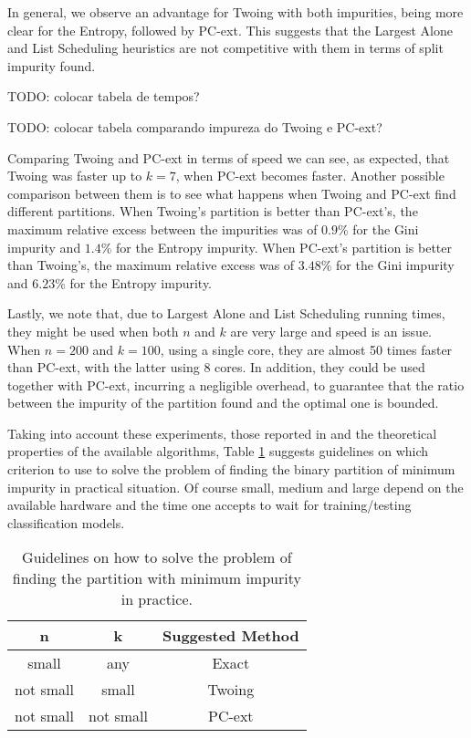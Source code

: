 In general, we observe an advantage for Twoing with both impurities, being more clear for the Entropy, followed by PC-ext. This suggests that the Largest Alone and List Scheduling heuristics are not competitive with them in terms of split impurity found.

TODO: colocar tabela de tempos?

TODO: colocar tabela comparando impureza do Twoing e PC-ext?

Comparing Twoing and PC-ext in terms of speed we can see, as expected, that Twoing was faster up to $k=7$, when PC-ext becomes faster.
Another possible comparison between them is to see what happens when Twoing and PC-ext find different partitions. When Twoing's partition is better than PC-ext's, the maximum relative excess between the impurities was of $0.9\%$ for the Gini impurity and $1.4 \%$ for the Entropy impurity.
When PC-ext's partition is better than Twoing's, the  maximum relative excess was of $3.48 \%$ for the Gini impurity and $6.23 \%$ for the Entropy impurity. 

Lastly, we note that, due to Largest Alone and List Scheduling running times, they might be used when both $n$ and $k$ are very large and
speed is an  issue. When $n=200$ and $k=100$, using a single core, they are almost 50 times
faster than PC-ext, with the latter using 8 cores. In addition, they could be  used together with PC-ext, incurring a negligible overhead, to guarantee that the ratio between the impurity of the partition found and the optimal one is bounded.

 
Taking into account these  experiments, those reported in \cite{journals/datamine/CoppersmithHH99}
and the  theoretical properties of the available algorithms, 
Table  \ref{tab:guidelines}  suggests  guidelines on which criterion to use to solve the 
problem of finding the binary partition of minimum impurity in practical situation.
Of course small, medium and large depend on the available hardware and the time one accepts to wait for training/testing classification models. 


\begin{table}[htb]
\centering
\caption{Guidelines on how to solve the problem of finding the partition with minimum impurity in practice.}
\label{tab:guidelines}
\begin{tabular}{c|c|c}
{\bf n}    & {\bf k}   & {\bf Suggested Method} \\ \hline 
small      & any       &  Exact \\
not small  & small     & Twoing \\
not small  & not small & PC-ext \\
\end{tabular}
\end{table}

